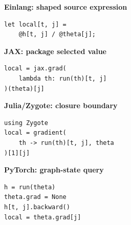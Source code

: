 \begin{minipage}[t]{0.48\linewidth}
\textbf{Einlang: shaped source expression}
\begin{lstlisting}[style=einlang,basicstyle=\ttfamily\footnotesize]
let local[t, j] =
    @h[t, j] / @theta[j];
\end{lstlisting}
\end{minipage}
\hfill
\begin{minipage}[t]{0.48\linewidth}
\textbf{JAX: package selected value}
\begin{lstlisting}[style=pythoncode,basicstyle=\ttfamily\footnotesize]
local = jax.grad(
    lambda th: run(th)[t, j]
)(theta)[j]
\end{lstlisting}
\end{minipage}

\vspace{0.45\baselineskip}
\begin{minipage}[t]{0.48\linewidth}
\textbf{Julia/Zygote: closure boundary}
\begin{lstlisting}[style=pythoncode,basicstyle=\ttfamily\footnotesize]
using Zygote
local = gradient(
    th -> run(th)[t, j], theta
)[1][j]
\end{lstlisting}
\end{minipage}
\hfill
\begin{minipage}[t]{0.48\linewidth}
\textbf{PyTorch: graph-state query}
\begin{lstlisting}[style=pythoncode,basicstyle=\ttfamily\footnotesize]
h = run(theta)
theta.grad = None
h[t, j].backward()
local = theta.grad[j]
\end{lstlisting}
\end{minipage}
